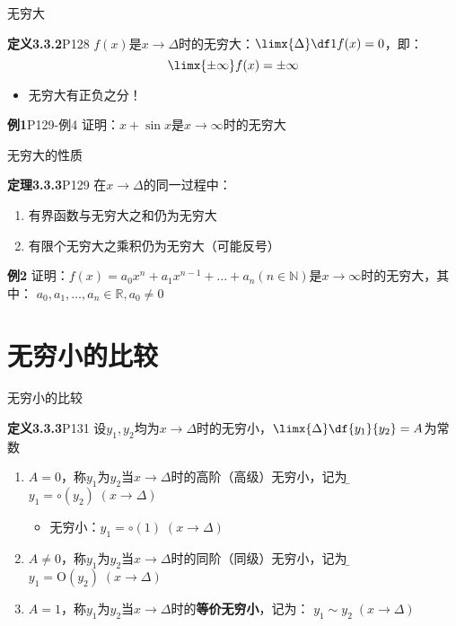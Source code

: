 \begin{frame}{无穷大}
	\linespread{1.2}\pause 
	\begin{block}{{\bf 定义3.3.2}\hfill P128}
		{\bb $f(x)$是$x\to\Delta$时的无穷大：}$\limx{\Delta}\df 1{f(x)}=0$，即：
		$$\limx{\pm\infty}f(x)=\pm\infty$$
	\end{block}\pause 
	\begin{itemize}
	  \item \alert{无穷大有正负之分！}\pause 
	\end{itemize}
	\begin{exampleblock}{{\bf 例1}\hfill P129-例4}
		证明：$x+\sin x$是$x\to\infty$时的无穷大
	\end{exampleblock}
\end{frame}

\begin{frame}{无穷大的性质}
	\linespread{1.5}\pause 
	\begin{block}{{\bf 定理3.3.3}\hfill P129}
		在$x\to\Delta$的同一过程中：\pause 
		\begin{enumerate}
		  \item \alert{有界函数与无穷大之和仍为无穷大}\pause 
		  \item \alert{有限个无穷大之乘积仍为无穷大\pause （可能反号）}\pause 
		\end{enumerate}
	\end{block}
	\begin{exampleblock}{{\bf 例2}\hfill }
		证明：$f(x)=a_0x^n+a_1x^{n-1}+\ldots+a_n(n\in\mathbb{N})$是$x\to\infty$时的无穷大，其中：
		$a_0,a_1,\ldots,a_n\in\mathbb{R},a_0\ne 0$
	\end{exampleblock}
\end{frame}

\section{无穷小的比较}

\begin{frame}{无穷小的比较}
	\linespread{1.2}\pause 
	\begin{block}{{\bf 定义3.3.3}\hfill P131}
		设$y_1,y_2$均为$x\to\Delta$时的无穷小，$\limx{\Delta}\df{y_1}{y_2}=A$为常数\pause 
		\begin{enumerate}
		  \item $A=0$，称$y_1$为$y_2$当$x\to\Delta$时的{\bb 高阶（高级）无穷小}，\pause 记为：{\b
		  $y_1=\circ( y_2)\;(x\to\Delta)$}\pause 
		  \begin{itemize}
		    \item 无穷小：\alert{$y_1=\circ(1)\;(x\to\Delta)$}\pause 
		  \end{itemize}
		  \item $A\ne 0$，称$y_1$为$y_2$当$x\to\Delta$时的{\bb 同阶（同级）无穷小}，\pause 记为：{\b
		  $y_1=\mathrm{O}( y_2)\;(x\to\Delta)$}\pause 
		  \item $A=1$，称$y_1$为$y_2$当$x\to\Delta$时的\alert{\bf 等价无穷小}，\pause 记为：\alert{
		  $y_1\sim y_2\;(x\to\Delta)$}
		\end{enumerate}
	\end{block}
\end{frame}

